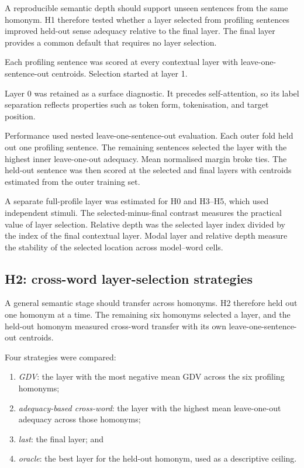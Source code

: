 \documentclass[conference]{IEEEtran}
\begin{document}
A reproducible semantic depth should support unseen sentences from the same
homonym. H1 therefore tested whether a layer selected from profiling sentences
improved held-out sense adequacy relative to the final layer. The final layer
provides a common default that requires no layer selection.

Each profiling sentence was scored at every contextual layer with
leave-one-sentence-out centroids. Selection started at layer 1.

Layer 0 was retained as a surface diagnostic. It precedes self-attention, so
its label separation reflects properties such as token form, tokenisation, and
target position.

Performance used nested leave-one-sentence-out evaluation. Each outer fold
held out one profiling sentence. The remaining sentences selected the layer
with the highest inner leave-one-out adequacy. Mean normalised margin broke
ties. The held-out sentence was then scored at the selected and final layers
with centroids estimated from the outer training set.

A separate full-profile layer was estimated for H0 and H3--H5, which used
independent stimuli. The selected-minus-final contrast measures the practical
value of layer selection. Relative depth was the selected layer index divided
by the index of the final contextual layer. Modal layer and relative depth
measure the stability of the selected location across model--word cells.

\subsection{H2: cross-word layer-selection strategies}
\label{sec:layer-selection}

A general semantic stage should transfer across homonyms. H2 therefore held out
one homonym at a time. The remaining six homonyms selected a layer, and the
held-out homonym measured cross-word transfer with its own
leave-one-sentence-out centroids.

Four strategies were compared:

\begin{enumerate}
    \item \emph{GDV}: the layer with the most negative mean GDV across the six
    profiling homonyms;
    \item \emph{adequacy-based cross-word}: the layer with the highest mean
    leave-one-out adequacy across those homonyms;
    \item \emph{last}: the final layer; and
    \item \emph{oracle}: the best layer for the held-out homonym, used as a
    descriptive ceiling.
\end{enumerate}
\end{document}

